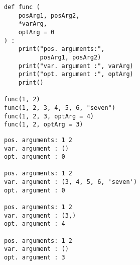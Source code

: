 
\begin{frame}[fragile]
%
\begin{tcbraster}[raster columns=2,
                  raster equal height,
                  nobeforeafter,
                  raster column skip=0.5cm]
\begin{codebox}
\begin{verbatim}
def func (
    posArg1, posArg2,
    *varArg,
    optArg = 0
) :
    print("pos. arguments:",
          posArg1, posArg2)
    print("var. argument :", varArg)
    print("opt. argument :", optArg)
    print()

func(1, 2)
func(1, 2, 3, 4, 5, 6, "seven")
func(1, 2, 3, optArg = 4)
func(1, 2, optArg = 3)
\end{verbatim}
\end{codebox}
%
\begin{cmdbox}
\begin{verbatim}
pos. arguments: 1 2
var. argument : ()
opt. argument : 0

pos. arguments: 1 2
var. argument : (3, 4, 5, 6, 'seven')
opt. argument : 0

pos. arguments: 1 2
var. argument : (3,)
opt. argument : 4

pos. arguments: 1 2
var. argument : ()
opt. argument : 3
\end{verbatim}
\end{cmdbox}
\end{tcbraster}
%
\end{frame}


